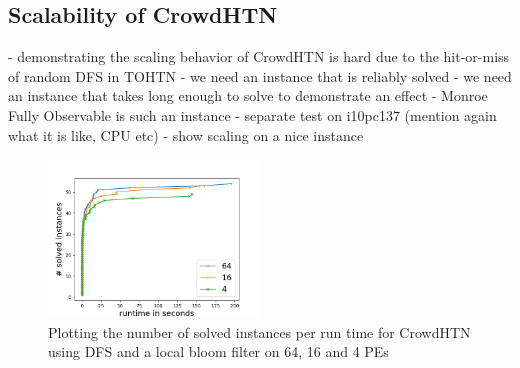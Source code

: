 \subsection{Scalability of CrowdHTN}
\label{eval: scalability}
- demonstrating the scaling behavior of CrowdHTN is hard due to the hit-or-miss of random DFS in TOHTN
- we need an instance that is reliably solved
- we need an instance that takes long enough to solve to demonstrate an effect
- Monroe Fully Observable is such an instance
- separate test on i10pc137 (mention again what it is like, CPU etc)
- show scaling on a nice instance

\begin{figure}
	\caption{Plotting the number of solved instances per run time for CrowdHTN using DFS and a local bloom filter on 64, 16 and 4 PEs}
	\label{figure: eval scalability}
	\centering
	\includegraphics[width=0.5\textwidth]{images/final/scalability}
\end{figure}

